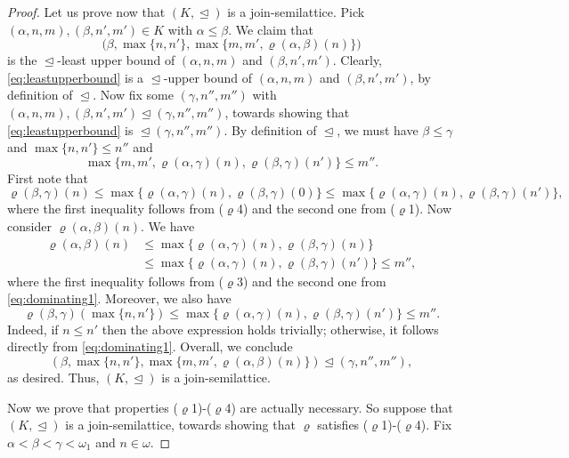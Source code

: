\documentclass[]{amsart}
\theoremstyle{definition}
\theoremstyle{remark}
\begin{document}
\begin{proof}
 Let us prove now that $(K, \trianglelefteq)$ is a join-semilattice. Pick $(\alpha, n, m), (\beta, n', m') \in K$ with $\alpha \le \beta$. We claim that 
\begin{equation}\label{eq:leastupperbound}
\big(\beta, \max\{n, n'\}, \max\{m, m', \varrho(\alpha, \beta)(n)\}\big)
\end{equation}
is the $\trianglelefteq$-least upper bound of $(\alpha, n, m)$ and $(\beta, n', m')$. Clearly, \eqref{eq:leastupperbound} is a $\trianglelefteq$-upper bound of $(\alpha, n, m)$ and $(\beta, n', m')$, by definition of $\trianglelefteq$. Now fix some $(\gamma, n'', m'')$ with $(\alpha, n, m), (\beta, n', m') \trianglelefteq (\gamma, n'', m'')$, towards showing that \eqref{eq:leastupperbound} is  $\trianglelefteq (\gamma, n'', m'')$. By definition of $\trianglelefteq$, we must have $\beta \le \gamma$ and $\max \{n, n'\} \le n''$ and 
\[
\max \{m, m', \varrho(\alpha, \gamma)(n), \varrho(\beta, \gamma)(n')\} \le m''.
\] 
First note that
\begin{equation}\label{eq:dominating1}
\varrho(\beta, \gamma)(n) \le \max \{\varrho(\alpha, \gamma)(n), \varrho(\beta, \gamma)(0)\} \le \max \{\varrho(\alpha, \gamma)(n), \varrho(\beta, \gamma)(n')\},
\end{equation}
where the first inequality follows from ($\varrho$4) and the second one from ($\varrho$1).  Now consider $\varrho(\alpha, \beta)(n)$. We have
\begin{align*}
\varrho(\alpha, \beta)(n) &\le \max \{\varrho(\alpha, \gamma)(n), \varrho(\beta, \gamma)(n)\}\\ &\le \max \{\varrho(\alpha, \gamma)(n), \varrho(\beta, \gamma)(n')\} \le m'',
\end{align*}
where the first inequality follows from ($\varrho$3) and the second one from \eqref{eq:dominating1}. Moreover, we also have
\[
\varrho(\beta, \gamma)(\max\{n,n'\}) \le \max \{\varrho(\alpha, \gamma)(n), \varrho(\beta, \gamma)(n')\} \le m''.
\]
Indeed, if $n \le n'$ then the above expression holds trivially; otherwise, it follows directly from \eqref{eq:dominating1}. Overall, we conclude
\[
(\beta, \max\{n, n'\}, \max\{m, m', \varrho(\alpha, \beta)(n)\}) \trianglelefteq (\gamma, n'', m''),
\]
as desired. Thus, $(K, \trianglelefteq)$ is a join-semilattice.

Now we prove that properties ($\varrho$1)-($\varrho$4) are actually necessary. So suppose that $(K, \trianglelefteq)$ is a join-semilattice, towards showing that $\varrho$ satisfies ($\varrho$1)-($\varrho$4). Fix $\alpha < \beta < \gamma < \omega_1$ and $n\in\omega$.


\end{proof}
\end{document}
